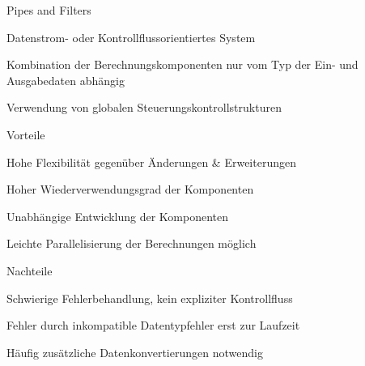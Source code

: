 \documentclass[a4paper]{article}
\begin{document}
\begin{multicols}{3}
  Pipes and Filters
  \begin{itemize*}
    \item Datenstrom- oder Kontrollflussorientiertes System
    \item Kombination der Berechnungskomponenten nur vom Typ der Ein- und Ausgabedaten abhängig
    \item Verwendung von globalen Steuerungskontrollstrukturen
    \item Vorteile
    \begin{itemize*}
      \item Hohe Flexibilität gegenüber Änderungen \& Erweiterungen
      \item Hoher Wiederverwendungsgrad der Komponenten
      \item Unabhängige Entwicklung der Komponenten
      \item Leichte Parallelisierung der Berechnungen möglich
    \end{itemize*}
    \item Nachteile
    \begin{itemize*}
      \item Schwierige Fehlerbehandlung, kein expliziter Kontrollfluss
      \item Fehler durch inkompatible Datentypfehler erst zur Laufzeit
      \item Häufig zusätzliche Datenkonvertierungen notwendig
    \end{itemize*}
  \end{itemize*}


\end{multicols}
\end{document}
